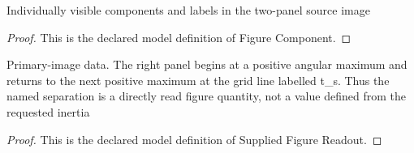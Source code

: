 \begin{definition}
  \label{def:physics:phyx-mini-0269:phyxminiproblems-problemphyxmini0269-figurecomponent}
  Individually visible components and labels in the two-panel source image
\end{definition}
\begin{proof}
  This is the declared model definition of Figure Component.
\end{proof}
\begin{definition}
  \label{def:physics:phyx-mini-0269:phyxminiproblems-problemphyxmini0269-suppliedfigurereadout}
  Primary-image data. The right panel begins at a positive angular maximum and returns to the next positive maximum at the grid line labelled t\_s. Thus the named separation is a directly read figure quantity, not a value defined from the requested inertia
\end{definition}
\begin{proof}
  This is the declared model definition of Supplied Figure Readout.
\end{proof}
